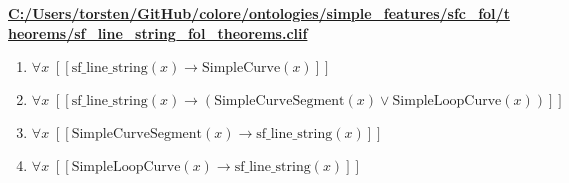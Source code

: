 \documentclass{article}
\begin{document}
\textbf{\url{C:/Users/torsten/GitHub/colore/ontologies/simple\_features/sfc\_fol/theorems/sf\_line\_string\_fol\_theorems.clif}}

\begin{enumerate}
\item $\forall x\;  \left[ \left[ \textrm{sf\_line\_string}(x) \rightarrow \textrm{SimpleCurve}(x) \right] \right]$
\item $\forall x\;  \left[ \left[ \textrm{sf\_line\_string}(x) \rightarrow \left(\textrm{SimpleCurveSegment}(x) \lor \textrm{SimpleLoopCurve}(x)\right) \right] \right]$
\item $\forall x\;  \left[ \left[ \textrm{SimpleCurveSegment}(x) \rightarrow \textrm{sf\_line\_string}(x) \right] \right]$
\item $\forall x\;  \left[ \left[ \textrm{SimpleLoopCurve}(x) \rightarrow \textrm{sf\_line\_string}(x) \right] \right]$
\end{enumerate}
\end{document}
